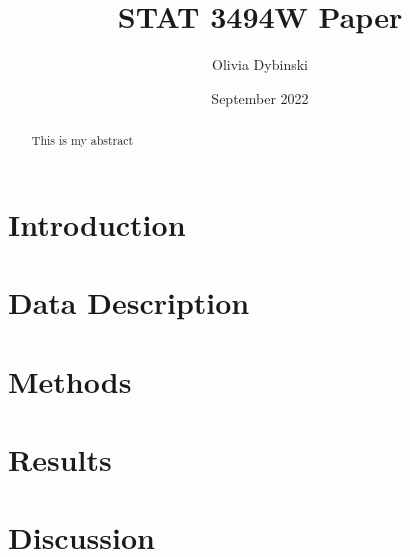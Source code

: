 \documentclass[12pt]{article}
\title{STAT 3494W Paper}
\author{Olivia Dybinski}
\date{September 2022}
\begin{document}
\maketitle

\begin{abstract}
    This is my abstract
\end{abstract}

\section{Introduction}

\section{Data Description}

\section{Methods}

\section{Results}

\section{Discussion}
\end{document}
